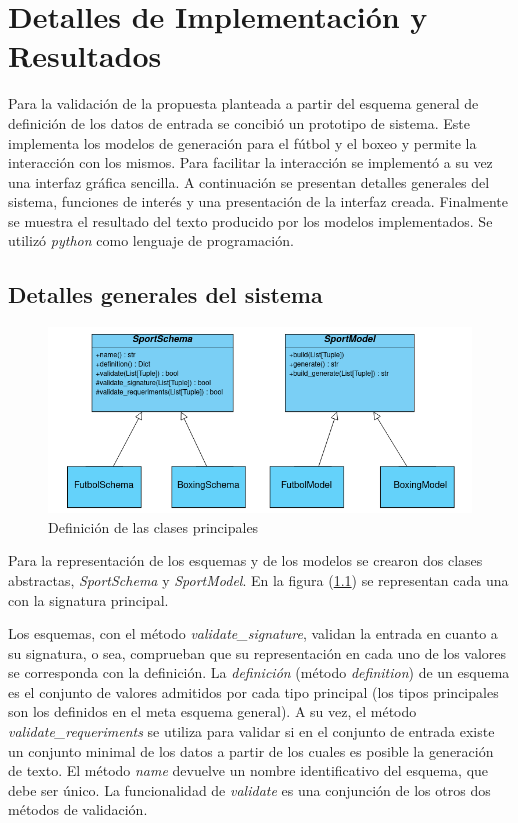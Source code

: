 \chapter{Detalles de Implementación y Resultados}\label{chapter:implementation}

Para la validación de la propuesta planteada a partir del esquema general de definición de los datos de entrada se concibió 
un prototipo de sistema. Este implementa los modelos de generación para el fútbol y el boxeo y permite la interacción
 con los mismos. Para facilitar la interacción se implementó a su vez una interfaz gráfica sencilla. A continuación se presentan 
 detalles generales del sistema, funciones de interés y una presentación de la interfaz creada. Finalmente se muestra el resultado del 
 texto producido por los modelos implementados. Se utilizó \emph{python} como 
 lenguaje de programación.
 
\section{Detalles generales del sistema}

\begin{figure}[!]
    \begin{center}
        \includegraphics[width=\textwidth]{Graphics/classDef3.png}
    \end{center}
    \caption{Definición de las clases principales}
    \label{fig_classDef}
\end{figure}

Para la representación de los esquemas y de los modelos se crearon dos clases abstractas, \textit{SportSchema} y 
\textit{SportModel}. En la figura (\ref{fig_classDef}) se representan cada una con la signatura principal. 

Los esquemas, con el m\'etodo \emph{validate\_signature}, validan la entrada en cuanto a su signatura, o sea, comprueban que 
su representación en cada uno de los valores se corresponda con la definición. La \textit{definición} (m\'etodo \emph{definition}) 
de un esquema es el conjunto de valores admitidos por cada tipo principal (los tipos principales son los definidos en el 
meta esquema general). A su vez, el método \emph{validate\_requeriments} se utiliza para validar si en el conjunto de entrada
 existe un conjunto minimal de los datos a partir de los cuales es posible la generación de texto. El m\'etodo \emph{name} devuelve 
 un nombre identificativo del esquema, que debe ser único. La funcionalidad de \emph{validate} es una conjunción de los otros dos 
 métodos de validación. 




